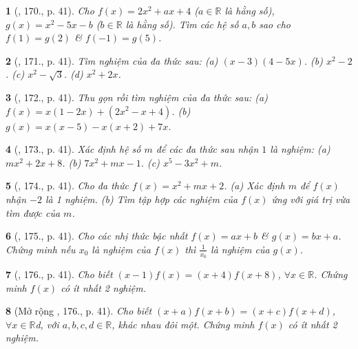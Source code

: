 \documentclass{article}
\newtheorem{baitoan}{}
\begin{document}
\begin{baitoan}[\cite{Tuyen_Toan_7}, 170., p. 41]
	Cho $f(x) = 2x^2 + ax + 4$ ($a\in\mathbb{R}$ là hằng số), $g(x) = x^2 - 5x - b$ ($b\in\mathbb{R}$ là hằng số). Tìm các hệ số $a,b$ sao cho $f(1) = g(2)$ \& $f(-1) = g(5)$.
\end{baitoan}

\begin{baitoan}[\cite{Tuyen_Toan_7}, 171., p. 41]
	Tìm nghiệm của đa thức sau: (a) $(x - 3)(4 - 5x)$. (b) $x^2 - 2$. (c) $x^2 - \sqrt{3}$. (d) $x^2 + 2x$.
\end{baitoan}

\begin{baitoan}[\cite{Tuyen_Toan_7}, 172., p. 41]
	Thu gọn rồi tìm nghiệm của đa thức sau: (a) $f(x) = x(1 - 2x) + (2x^2 - x + 4)$. (b) $g(x) = x(x - 5) - x(x + 2) + 7x$.
\end{baitoan}

\begin{baitoan}[\cite{Tuyen_Toan_7}, 173., p. 41]
	Xác định hệ số $m$ để các đa thức sau nhận $1$ là nghiệm: (a) $mx^2 + 2x + 8$. (b) $7x^2 + mx - 1$. (c) $x^5 - 3x^2 + m$.
\end{baitoan}

\begin{baitoan}[\cite{Tuyen_Toan_7}, 174., p. 41]
	Cho đa thức $f(x) = x^2 + mx + 2$. (a) Xác định $m$ để $f(x)$ nhận $-2$ là 1 nghiệm. (b) Tìm tập hợp các nghiệm của $f(x)$ ứng với giá trị vừa tìm được của $m$.
\end{baitoan}

\begin{baitoan}[\cite{Tuyen_Toan_7}, 175., p. 41]
	Cho các nhị thức bậc nhất $f(x) = ax + b$ \& $g(x) = bx + a$. Chứng minh nếu $x_0$ là nghiệm của $f(x)$ thì $\frac{1}{x_0}$ là nghiệm của $g(x)$.
\end{baitoan}

\begin{baitoan}[\cite{Tuyen_Toan_7}, 176., p. 41]
	Cho biết $(x - 1)f(x) = (x + 4)f(x + 8)$, $\forall x\in\mathbb{R}$. Chứng minh $f(x)$ có ít nhất 2 nghiệm.
\end{baitoan}

\begin{baitoan}[Mở rộng \cite{Tuyen_Toan_7}, 176., p. 41]
	Cho biết $(x + a)f(x + b) = (x + c)f(x + d)$, $\forall x\in\mathbb{R}$d, với $a,b,c,d\in\mathbb{R}$, khác nhau đôi một. Chứng minh $f(x)$ có ít nhất 2 nghiệm.
\end{baitoan}

\end{document}

